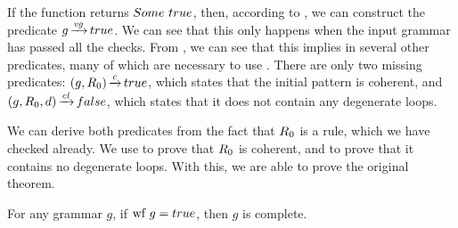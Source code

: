 If the function \textit{\verifygrammarname{}}
returns $Some\ true$,
then,
according to ,
we can construct the predicate $g \operatorname{\xrightarrow{\mathit{vg}}} true$.
We can see that this only happens when
the input grammar has passed
all the checks.
From ,
we can see that this implies in
several other predicates,
many of which are necessary to use
.
There are only two missing predicates:
$(g,R_{0}) \operatorname{\xrightarrow{\mathit{c}}} true$,
which states that the initial pattern is coherent,
and $(g,R_{0},d) \operatorname{\xrightarrow{\mathit{cl}}} false$,
which states that it does not contain any degenerate loops.

We can derive both predicates
from the fact that $R_{0}$ is a rule,
which we have checked already.
We use 
to prove that $R_{0}$ is coherent,
and 
to prove that it contains no degenerate loops.
With this, we are able to prove the original theorem.

\begin{theorem}
    For any grammar $g$,
    if $\text{wf}\ g = true$,
    then $g$ is complete.
\end{theorem}
